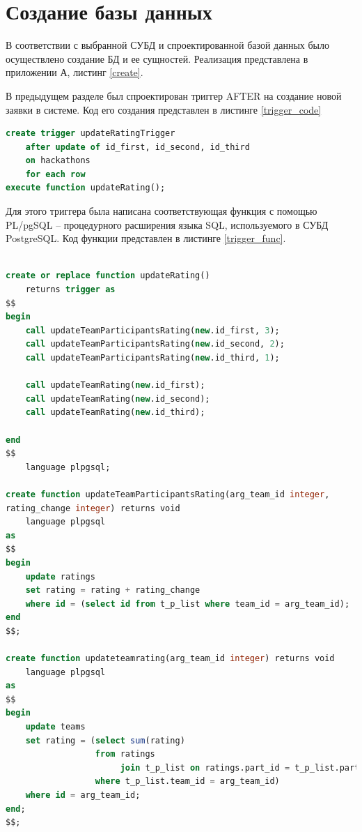 \section{Создание базы данных}

В соответствии с выбранной СУБД и спроектированной базой данных было осуществлено создание БД и ее сущностей. Реализация представлена в приложении А, листинг \ref{create}.

В предыдущем разделе был спроектирован триггер AFTER на создание новой заявки в системе. Код его создания представлен в листинге \ref{trigger_code}

\captionsetup{singlelinecheck = false, justification=raggedright}
\begin{lstlisting}[language=sql, caption=Реализация триггера AFTER, label=trigger_code]
create trigger updateRatingTrigger
    after update of id_first, id_second, id_third
    on hackathons
    for each row
execute function updateRating();

\end{lstlisting}
\captionsetup{singlelinecheck = false, justification=centering}

Для этого триггера была написана соответствующая функция с помощью
PL/pgSQL \cite{plpgsql} -- процедурного расширения языка SQL, 
используемого в \newline СУБД PostgreSQL. Код функции представлен в листинге \ref{trigger_func}.

\captionsetup{singlelinecheck = false, justification=raggedright}
\begin{lstlisting}[language=sql, caption=Реализация функции updateRating(), label=trigger_func]

create or replace function updateRating()
    returns trigger as
$$
begin
    call updateTeamParticipantsRating(new.id_first, 3);
    call updateTeamParticipantsRating(new.id_second, 2);
    call updateTeamParticipantsRating(new.id_third, 1);

    call updateTeamRating(new.id_first);
    call updateTeamRating(new.id_second);
    call updateTeamRating(new.id_third);

end
$$
    language plpgsql;
    
create function updateTeamParticipantsRating(arg_team_id integer, 
rating_change integer) returns void
    language plpgsql
as
$$
begin
    update ratings
    set rating = rating + rating_change
    where id = (select id from t_p_list where team_id = arg_team_id);
end
$$;

create function updateteamrating(arg_team_id integer) returns void
    language plpgsql
as
$$
begin
    update teams
    set rating = (select sum(rating)
                  from ratings
                       join t_p_list on ratings.part_id = t_p_list.part_id
                  where t_p_list.team_id = arg_team_id)
    where id = arg_team_id;
end;
$$;

\end{lstlisting}
\captionsetup{singlelinecheck = false, justification=centering}


